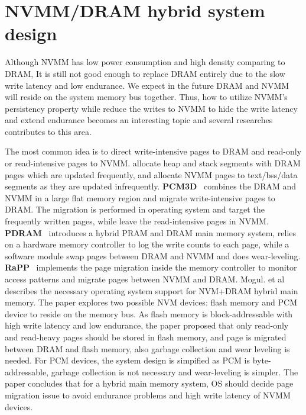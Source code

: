 \section{NVMM/DRAM hybrid system design} 
\label{sec:migration}

Although NVMM has low power consumption and high density comparing to DRAM,
It is still not good enough to replace DRAM entirely due to the slow write
latency and low endurance. We expect in the future DRAM and NVMM
will reside on the system memory bus together.
Thus, how to utilize NVMM's persistency property while reduce the writes to
NVMM to hide the write latency and extend endurance becomes an interesting
topic and several researches contributes to this area.

The most common idea is to direct write-intensive pages to DRAM and read-only
or read-intensive pages to NVMM.
\cite{pcmalloc} allocate heap and stack segments with DRAM pages which are
updated frequently, and allocate NVMM pages to text/bss/data segments as
they are updated infrequently.
\textbf{PCM3D}~\cite{pcm3d} combines the DRAM
and NVMM in a large flat memory region and migrate write-intensive pages
to DRAM. The migration is performed in operating system and target the
frequently written pages, while leave the read-intensive pages in NVMM.
\textbf{PDRAM}~\cite{pdram} introduces a hybrid PRAM and DRAM main memory
system, 
relies on a hardware memory controller to log the write counts to each page,
while a software module swap pages between DRAM and NVMM and does wear-leveling.
\textbf{RaPP}~\cite{RaPP} implements the page migration inside the memory
controller to monitor access patterns and migrate pages between NVMM and DRAM. 
Mogul. et al~\cite{Mogul} describes the necessary operating system support for
NVM+DRAM hybrid main memory. The paper explores two possible NVM devices:
flash memory and PCM device to reside on the memory bus. As flash memory
is block-addressable with high write latency and low endurance, the paper
proposed that only read-only and read-heavy pages should be stored in flash
memory, and page is migrated between DRAM and flash memory, also garbage
collection and wear leveling is needed. For PCM devices, the system design
is simpified as PCM is byte-addressable, garbage collection is not necessary
and wear-leveling is simpler. The paper concludes that for a hybrid main
memory system, OS should decide page migration issue to avoid endurance
problems and high write latency of NVMM devices.


